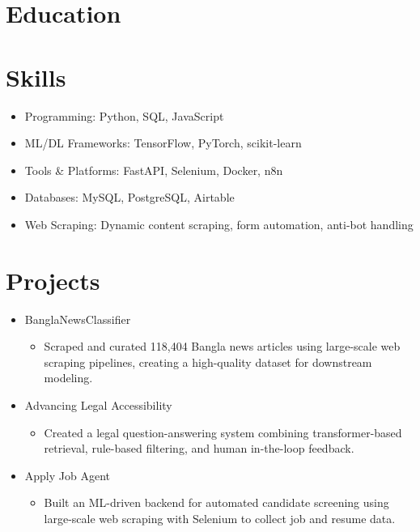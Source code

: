 \documentclass[11pt,a4paper,sans]{moderncv}
\begin{document}
\section{Education}

\section{Skills}
\begin{itemize}
    \item Programming: Python, SQL, JavaScript
    \item ML/DL Frameworks: TensorFlow, PyTorch, scikit-learn
    \item Tools \& Platforms: FastAPI, Selenium, Docker, n8n
    \item Databases: MySQL, PostgreSQL, Airtable
    \item Web Scraping: Dynamic content scraping, form automation, anti-bot handling
\end{itemize}

\section{Projects}
\begin{itemize}
    \item BanglaNewsClassifier
    \begin{itemize}
        \item Scraped and curated 118,404 Bangla news articles using large-scale web scraping pipelines, creating a high-quality dataset for downstream modeling.
    \end{itemize}
    \item Advancing Legal Accessibility
    \begin{itemize}
        \item Created a legal question-answering system combining transformer-based retrieval, rule-based filtering, and human in-the-loop feedback.
    \end{itemize}
    \item Apply Job Agent
    \begin{itemize}
        \item Built an ML-driven backend for automated candidate screening using large-scale web scraping with Selenium to collect job and resume data.
    \end{itemize}
\end{itemize}
\end{document}
